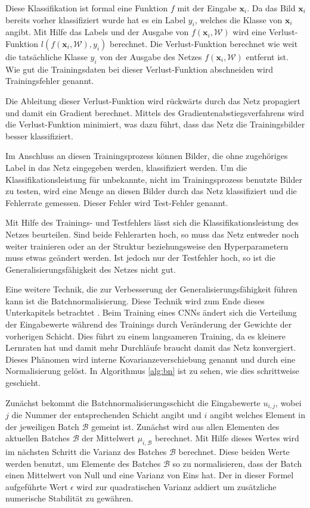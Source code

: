 Diese Klassifikation ist formal eine Funktion $f$ mit der Eingabe $\mathbf{x}_i$. Da das Bild $\mathbf{x}_i$ bereits vorher klassifiziert wurde hat es ein Label $y_i$, welches die Klasse von $\mathbf{x}_i$ angibt. Mit Hilfe das Labels und der Ausgabe von $f(\mathbf{x}_i, \mathcal{W})$ wird eine Verlust-Funktion $l(f(\mathbf{x}_i,\mathcal{W}),y_i)$ berechnet. Die Verlust-Funktion berechnet wie weit die tatsächliche Klasse $y_i$ von der Ausgabe des Netzes $f(\mathbf{x}_i, \mathcal{W})$ entfernt ist. Wie gut die Trainingsdaten bei dieser Verlust-Funktion abschneiden wird Trainingsfehler genannt.


Die Ableitung dieser Verlust-Funktion wird rückwärts durch das Netz propagiert und damit ein Gradient berechnet. Mittels des Gradientenabstiegsverfahrens wird die Verlust-Funktion minimiert, was dazu führt, dass das Netz die Trainingsbilder besser klassifiziert. 


Im Anschluss an diesen Trainingsprozess können Bilder, die ohne zugehöriges Label in das Netz eingegeben werden, klassifiziert werden. Um die Klassifikationsleistung für unbekannte, nicht im Trainingsprozess benutzte Bilder zu testen, wird eine Menge an diesen Bilder durch das Netz klassifiziert und die Fehlerrate gemessen. Dieser Fehler wird Test-Fehler genannt. 


Mit Hilfe des Trainings- und Testfehlers lässt sich die Klassifikationsleistung des Netzes beurteilen. Sind beide Fehlerarten hoch, so muss das Netz entweder noch weiter trainieren oder an der Struktur beziehungsweise den Hyperparametern muss etwas geändert werden. Ist jedoch nur der Testfehler hoch, so ist die Generalisierungsfähigkeit des Netzes nicht gut. 

Eine weitere Technik, die zur Verbesserung der Generalisierungsfähigkeit führen kann ist die Batchnormalisierung. Diese Technik wird zum Ende dieses Unterkapitels betrachtet \cite{batchnorm}. Beim Training eines CNNs ändert sich die Verteilung der Eingabewerte während des Trainings durch Veränderung der Gewichte der vorherigen Schicht. Dies führt zu einem langsameren Training, da es kleinere Lernraten hat und damit mehr Durchläufe braucht damit das Netz konvergiert. Dieses Phänomen wird interne Kovarianzeverschiebung genannt und durch eine Normalisierung gelöst. In Algorithmus \ref{alg:bn} ist zu sehen, wie dies schrittweise geschieht.


Zunächst bekommt die Batchnormalisierungsschicht die Eingabewerte $u_{i,j}$, wobei $j$ die Nummer der entsprechenden Schicht angibt und $i$ angibt welches Element in der jeweiligen Batch $\mathcal{B}$ gemeint ist. Zunächst wird aus allen Elementen des aktuellen Batches $\mathcal{B}$ der Mittelwert $\mu_{i,\mathcal{B}}$ berechnet. Mit Hilfe dieses Wertes wird im nächsten Schritt die Varianz des Batches $\mathcal{B}$ berechnet. Diese beiden Werte werden benutzt, um Elemente des Batches $\mathcal{B}$ so zu normalisieren, dass der Batch einen Mittelwert von Null und eine Varianz von Eins hat. Der in dieser Formel aufgeführte Wert $\epsilon$ wird zur quadratischen Varianz addiert um zusätzliche numerische Stabilität zu gewähren. 


